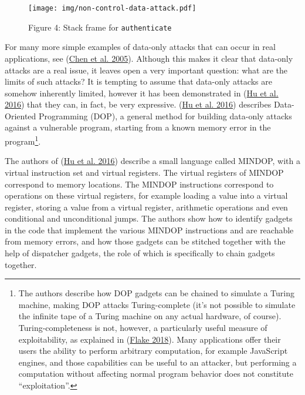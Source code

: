 \documentclass[
  a4paper,
]{report}
\begin{document}
\begin{figure}
\hypertarget{fig:non-control-data-attack}{%
\centering
\texttt{[image: img/non-control-data-attack.pdf]}
\caption{Figure 4: Stack frame for
\texttt{authenticate}}\label{fig:non-control-data-attack}
}
\end{figure}

For many more simple examples of data-only attacks that can occur in
real applications, see (\protect\hyperlink{ref-Chen2005}{Chen et al.
2005}). Although this makes it clear that data-only attacks are a real
issue, it leaves open a very important question: what are the limits of
such attacks? It is tempting to assume that data-only attacks are
somehow inherently limited, however it has been demonstrated in
(\protect\hyperlink{ref-Hu2016}{Hu et al. 2016}) that they can, in fact,
be very expressive. (\protect\hyperlink{ref-Hu2016}{Hu et al. 2016})
describes Data-Oriented Programming (DOP), a general method for building
data-only attacks against a vulnerable program, starting from a known
memory error in the program\footnote{The authors describe how DOP
  gadgets can be chained to simulate a Turing machine, making DOP
  attacks Turing-complete (it's not possible to simulate the infinite
  tape of a Turing machine on any actual hardware, of course).
  Turing-completeness is not, however, a particularly useful measure of
  exploitability, as explained in
  (\protect\hyperlink{ref-Dullien2018}{Flake 2018}). Many applications
  offer their users the ability to perform arbitrary computation, for
  example JavaScript engines, and those capabilities can be useful to an
  attacker, but performing a computation without affecting normal
  program behavior does not constitute ``exploitation''.}.

The authors of (\protect\hyperlink{ref-Hu2016}{Hu et al. 2016}) describe
a small language called MINDOP, with a virtual instruction set and
virtual registers. The virtual registers of MINDOP correspond to memory
locations. The MINDOP instructions correspond to operations on these
virtual registers, for example loading a value into a virtual register,
storing a value from a virtual register, arithmetic operations and even
conditional and unconditional jumps. The authors show how to identify
gadgets in the code that implement the various MINDOP instructions and
are reachable from memory errors, and how those gadgets can be stitched
together with the help of dispatcher gadgets, the role of which is
specifically to chain gadgets together.
\end{document}
